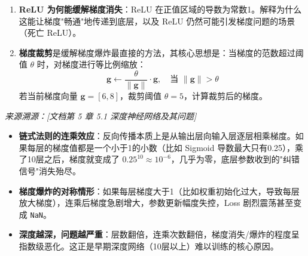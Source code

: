 \documentclass[a4paper,11pt]{ctexart}
\begin{document}
\begin{problembox}
\begin{enumerate}[(1)]
        \item \textbf{ReLU 为何能缓解梯度消失}：ReLU 在正值区域的导数为常数1。解释为什么这能让梯度"畅通"地传递到底层，以及 ReLU 仍然可能引发梯度问题的场景（死亡 ReLU）。

        \item \textbf{梯度裁剪}是缓解梯度爆炸最直接的方法，其核心思想是：当梯度的范数超过阈值 $\theta$ 时，对梯度进行等比例缩放：
        \[
        \mathbf{g} \leftarrow \frac{\theta}{\|\mathbf{g}\|} \cdot \mathbf{g}, \quad \text{当 } \|\mathbf{g}\| > \theta
        \]
        若当前梯度向量 $\mathbf{g} = [6, 8]$，裁剪阈值 $\theta = 5$，计算裁剪后的梯度。
    \end{enumerate}

    \vspace{0.2cm}
    {\color{gray}\small\textit{来源溯源：[文档第 5 章 5.1 深度神经网络及其问题]}}
\end{problembox}

\begin{beginnerbox}
    \begin{itemize}
        \item \textbf{链式法则的连乘效应}：反向传播本质上是从输出层向输入层逐层相乘梯度。如果每层的梯度值都是一个小于1的小数（比如 Sigmoid 导数最大只有0.25），乘了10层之后，梯度就变成了 $0.25^{10} \approx 10^{-6}$，几乎为零，底层参数收到的"纠错信号"消失殆尽。
        \item \textbf{梯度爆炸的对称情形}：如果每层梯度大于1（比如权重初始化过大，导致每层放大梯度），连乘后梯度急剧增大，参数更新幅度失控，Loss 剧烈震荡甚至变成 \texttt{NaN}。
        \item \textbf{深度越深，问题越严重}：层数翻倍，连乘次数翻倍，梯度消失/爆炸的程度呈指数级恶化。这正是早期深度网络（10层以上）难以训练的核心原因。
    \end{itemize}
\end{beginnerbox}
\end{document}
